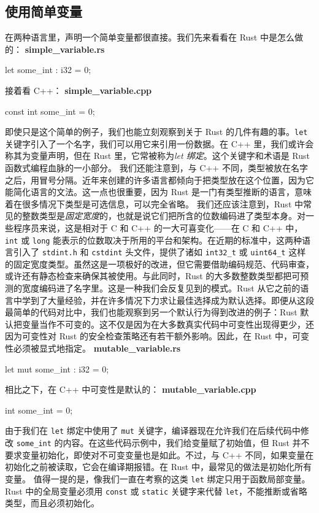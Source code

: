 \subsection{使用简单变量}
\label{idx:idx_56d5638b}
在两种语言里，声明一个简单变量都很直接。我们先来看看在 Rust 中是怎么做的：
\textbf{simple\_\allowbreak{}variable.\allowbreak{}rs}
\begin{codebox}[rust]
let some_int : i32 = 0;
\end{codebox}
接着看 C++：
\textbf{simple\_\allowbreak{}variable.\allowbreak{}cpp}
\begin{codebox}[rust]
const int some_int = 0;
\end{codebox}
即使只是这个简单的例子，我们也能立刻观察到关于 Rust 的几件有趣的事。\texttt{let} 关键字引入了一个名字，我们可以用它来引用一份数据。在 C++ 里，我们或许会称其为变量声明，但在 Rust 里，它常被称为\emph{let 绑定}。这个关键字和术语是 Rust 函数式编程血脉的一小部分。
我们还能注意到，与 C++ 不同，类型被放在名字之后，用冒号分隔。近年来创建的许多语言都倾向于把类型放在这个位置，因为它能简化语言的文法。这一点也很重要，因为 Rust 是一门有类型推断的语言，意味着在很多情况下类型是可选信息，可以完全省略。
\label{idx:idx_ccf9e943}
我们还应该注意到，Rust 中常见的整数类型是\emph{固定宽度}的，也就是说它们把所含的位数编码进了类型本身。对一些程序员来说，这是相对于 C 和 C++ 的一大可喜变化——在 C 和 C++ 中，\texttt{int} 或 \texttt{long} 能表示的位数取决于所用的平台和架构。在近期的标准中，这两种语言引入了 \texttt{stdint.h} 和 \texttt{cstdint} 头文件，提供了诸如 \texttt{int32\_t} 或 \texttt{uint64\_t} 这样的固定宽度类型。虽然这是一项极好的改进，但它需要借助编码规范、代码审查，或许还有静态检查来确保其被使用。与此同时，Rust 的大多数整数类型都把可预测的宽度编码进了名字里。这是一种我们会反复见到的模式。Rust 从它之前的语言中学到了大量经验，并在许多情况下力求让最佳选择成为默认选择。即便从这段最简单的代码对比中，我们也能观察到另一个默认行为得到改进的例子：Rust 默认把变量当作不可变的。这不仅是因为在大多数真实代码中可变性出现得更少，还因为可变性对 Rust 的安全检查策略还有若干额外影响。因此，在 Rust 中，可变性必须被显式地指定。
\textbf{mutable\_\allowbreak{}variable.\allowbreak{}rs}
\begin{codebox}[rust]
let mut some_int : i32 = 0;
\end{codebox}
相比之下，在 C++ 中可变性是默认的：
\textbf{mutable\_\allowbreak{}variable.\allowbreak{}cpp}
\begin{codebox}[text]
int some_int = 0;
\end{codebox}
由于我们在 \texttt{let} 绑定中使用了 \texttt{mut} 关键字，编译器现在允许我们在后续代码中修改 \texttt{some\_int} 的内容。在这些代码示例中，我们给变量赋了初始值，但 Rust 并不要求变量初始化，即使对不可变变量也是如此。不过，与 C++ 不同，如果变量在初始化之前被读取，它会在编译期报错。在 Rust 中，最常见的做法是初始化所有变量。
\label{idx:idx_3316c996}
值得一提的是，像我们一直在考察的这类 \texttt{let} 绑定只用于函数局部变量。Rust 中的全局变量必须用 \texttt{const} 或 \texttt{static} 关键字来代替 \texttt{let}，不能推断或省略类型，而且必须初始化。
